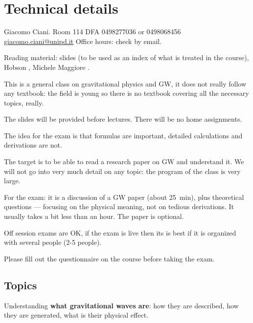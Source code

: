 \documentclass[main.tex]{subfiles}
\begin{document}

\section{Technical details}

Giacomo Ciani. Room 114 DFA
0498277036 or 0498068456
\url{giacomo.ciani@unipd.it}
Office hours: check by email.

Reading material: slides (to be used as an index of what is treated in the course), Hobson \cite[]{hobsonGeneralRelativityIntroduction2006a}, Michele Maggiore \cite[]{maggioreGravitationalWavesVolume2007,maggioreGravitationalWavesVolume2018}.

This is a general class on gravitational physics and GW, it does not really follow any textbook:
the field is young so there is no textbook covering all the necessary topics, really. 

The slides will be provided before lectures. There will be no home assignments. 

The idea for the exam is that formulas are important, detailed calculations and derivations are not. 

The target is to be able to read a research paper on GW and understand it. 
We will not go into very much detail on any topic:
the program of the class is very large. 

For the exam: it is a discussion of a GW paper (about \SI{25}{min}), plus theoretical questions --- focusing on the physical meaning, not on tedious derivations. It usually takes a bit less than an hour. 
The paper is optional. 

Off session exams are OK, if the exam is live then its is best if it is organized with several people (2-5 people). 

Please fill out the questionnaire on the course before taking the exam. 

\subsection{Topics}

Understanding \textbf{what gravitational waves are}: how they are described, how they are generated, what is their physical effect. 

\end{document}
